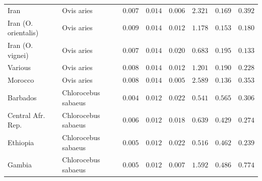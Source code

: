 \documentclass{article}
\begin{document}
\begin{center}
\begin{longtable*}{|l|l|r|r|r|r|r|r|}
            Iran &          Ovis aries &               $ 0.007$ &              $ 0.014$ &              $ 0.006$ &                                          $ 2.321$ &                         $ 0.169$ &                      $ 0.392$ \\
            Iran (O. orientalis) &          Ovis aries &               $ 0.009$ &              $ 0.014$ &              $ 0.012$ &                                          $ 1.178$ &                         $ 0.153$ &                      $ 0.180$ \\
            Iran (O. vignei) &          Ovis aries &               $ 0.007$ &              $ 0.014$ &              $ 0.020$ &                                          $ 0.683$ &                         $ 0.195$ &                      $ 0.133$ \\
            Various &          Ovis aries &               $ 0.008$ &              $ 0.014$ &              $ 0.012$ &                                          $ 1.201$ &                         $ 0.190$ &                      $ 0.228$ \\
            Morocco &          Ovis aries &               $ 0.008$ &              $ 0.014$ &              $ 0.005$ &                                          $ 2.589$ &                         $ 0.136$ &                      $ 0.353$ \\
             Barbados & Chlorocebus sabaeus &               $ 0.004$ &              $ 0.012$ &              $ 0.022$ &                                          $ 0.541$ &                         $ 0.565$ &                      $ 0.306$ \\
             Central Afr. Rep. & Chlorocebus sabaeus &               $ 0.006$ &              $ 0.012$ &              $ 0.018$ &                                          $ 0.639$ &                         $ 0.429$ &                      $ 0.274$ \\
             Ethiopia & Chlorocebus sabaeus &               $ 0.005$ &              $ 0.012$ &              $ 0.022$ &                                          $ 0.516$ &                         $ 0.462$ &                      $ 0.239$ \\
             Gambia & Chlorocebus sabaeus &               $ 0.005$ &              $ 0.012$ &              $ 0.007$ &                                          $ 1.592$ &                         $ 0.486$ &                      $ 0.774$ \\

\end{longtable*}
\end{center}
\end{document}

